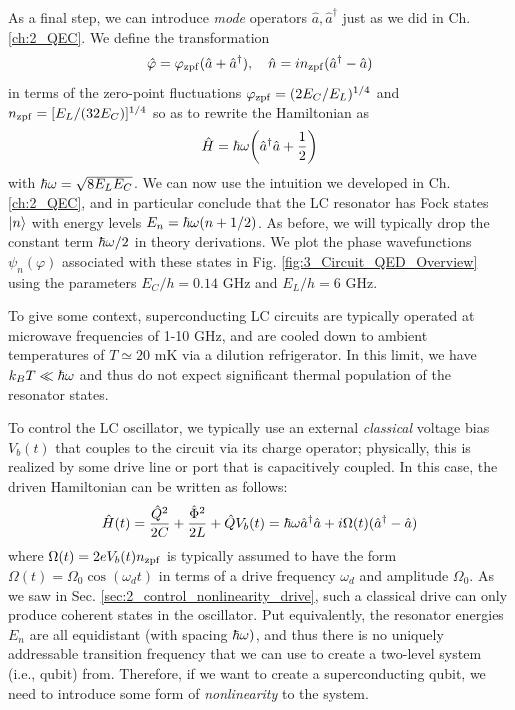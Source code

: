 As a final step, we can introduce \textit{mode} operators $\hat{a}, \hat{a}^\dagger$ just as we did in Ch. \ref{ch:2_QEC}. We define the transformation
\begin{equation}
    \hat{\varphi} = \varphi_{\rm zpf}(\hat{a} + \hat{a}^\dagger), \quad \hat{n} = in_{\rm zpf}(\hat{a}^\dagger - \hat{a})
\end{equation}
in terms of the zero-point fluctuations $\varphi_{\rm zpf} = (2E_C/E_L)^{1/4}$ and $n_{\rm zpf} =  [E_L/(32E_C)]^{1/4}$ so as to rewrite the Hamiltonian as
\begin{equation}
    \hat{H} = \hbar\omega\bigg(\hat{a}^\dagger\hat{a} + \frac{1}{2}\bigg)
    \label{eq:3_LC_QHO}
\end{equation}
with $\hbar\omega = \sqrt{8 E_LE_C}$. We can now use the intuition we developed in Ch. \ref{ch:2_QEC}, and in particular conclude that the LC resonator has Fock states $\lvert n\rangle$ with energy levels $E_n = \hbar\omega(n+1/2)$. As before, we will typically drop the constant term $\hbar\omega/2$ in theory derivations. We plot the phase wavefunctions $\psi_n(\varphi)$ associated with these states in Fig. \ref{fig:3_Circuit_QED_Overview} using the parameters $E_C/h = 0.14$ GHz and $E_L/h = 6$ GHz. 

To give some context, superconducting LC circuits are typically operated at microwave frequencies of 1-10 GHz, and are cooled down to ambient temperatures of $T \simeq 20$ mK via a dilution refrigerator. In this limit, we have $k_BT \ll \hbar\omega$ and thus do not expect significant thermal population of the resonator states. 

To control the LC oscillator, we typically use an external \textit{classical} voltage bias $V_b(t)$ that couples to the circuit via its charge operator; physically, this is realized by some drive line or port that is capacitively coupled. In this case, the driven Hamiltonian can be written as follows:
\begin{equation}
    \hat{H}(t) = \frac{\hat{Q}^2}{2C} + \frac{\hat{\Phi}^2}{2L} + \hat{Q}V_b(t) = \hbar\omega\hat{a}^\dagger\hat{a} + i\Omega(t) (\hat{a}^\dagger - \hat{a})
\end{equation}
where $\Omega(t) = 2eV_b(t)n_{\rm zpf}$ is typically assumed to have the form $\Omega(t) = \Omega_0\cos(\omega_d t)$ in terms of a drive frequency $\omega_d$ and amplitude $\Omega_0$. As we saw in Sec. \ref{sec:2_control_nonlinearity_drive}, such a classical drive can only produce coherent states in the oscillator. Put equivalently, the resonator energies $E_n$ are all equidistant (with spacing $\hbar\omega)$, and thus there is no uniquely addressable transition frequency that we can use to create a two-level system (i.e., qubit) from. Therefore, if we want to create a superconducting qubit, we need to introduce some form of \textit{nonlinearity} to the system. 


